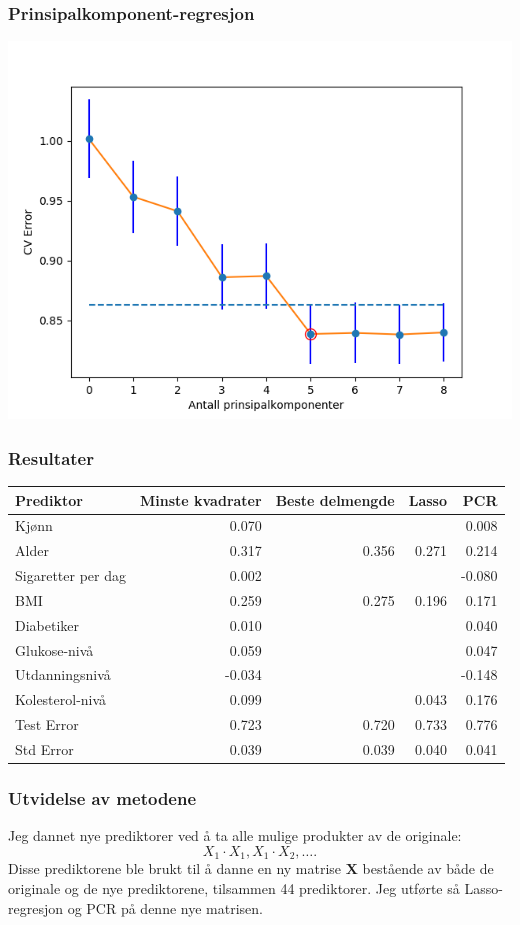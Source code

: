 \documentclass[aspectratio=169]{beamer}
\begin{document}
\begin{frame}
  \frametitle{Prinsipalkomponent-regresjon}
  \begin{center}
    \includegraphics[height=0.8\textheight]{pcr_CV.png}
  \end{center}
\end{frame}

\begin{frame}
  \frametitle{Resultater}
  \begin{tabular}{ l r r r r}
    Prediktor & Minste kvadrater & Beste delmengde & Lasso & PCR \\
    \hline
    Kjønn & 0.070 & & & 0.008 \\
    Alder & 0.317 & 0.356 & 0.271 & 0.214 \\
    Sigaretter per dag & 0.002 & & & -0.080 \\
    BMI & 0.259 & 0.275 & 0.196 & 0.171 \\
    Diabetiker & 0.010 & & & 0.040 \\
    Glukose-nivå & 0.059 & & & 0.047 \\
    Utdanningsnivå & -0.034 & & & -0.148 \\
    Kolesterol-nivå & 0.099 & & 0.043 & 0.176 \\
    \hline
    Test Error & 0.723 & 0.720 & 0.733 & 0.776 \\
    Std Error & 0.039 & 0.039 & 0.040 & 0.041 \\
  \end{tabular}
\end{frame}

\begin{frame}
  \frametitle{Utvidelse av metodene}

  Jeg dannet nye prediktorer ved å ta alle mulige produkter av de originale: \[X_1 \cdot X_1, X_1 \cdot X_2, \dots.\]
  \pause
  Disse prediktorene ble brukt til å danne en ny matrise \(\textbf{X}\) bestående av både de originale og de nye prediktorene, tilsammen 44 prediktorer.
  \pause
  Jeg utførte så Lasso-regresjon og PCR på denne nye matrisen.
\end{frame}
\end{document}
